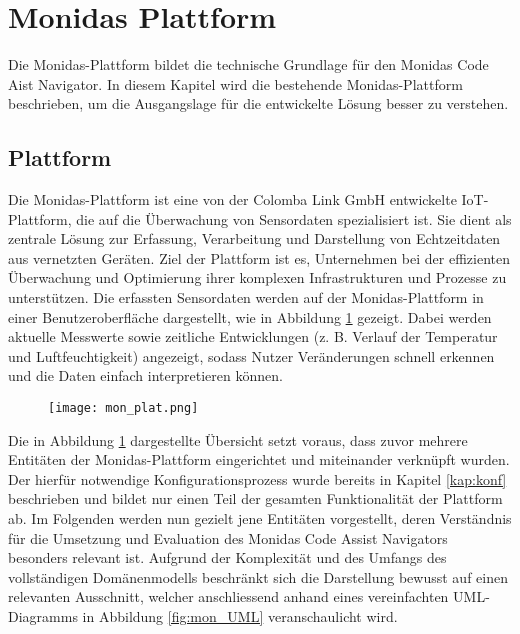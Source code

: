 \section{Monidas Plattform}
\label{mon}
Die Monidas-Plattform bildet die technische Grundlage für den Monidas Code Aist Navigator. In diesem Kapitel wird die bestehende Monidas-Plattform beschrieben, um die Ausgangslage für die entwickelte Lösung besser zu verstehen.

\subsection{Plattform}
Die Monidas-Plattform ist eine von der Colomba Link GmbH entwickelte IoT-Plattform, die auf die Überwachung von Sensordaten spezialisiert ist. Sie dient als zentrale Lösung zur Erfassung, Verarbeitung und Darstellung von Echtzeitdaten aus vernetzten Geräten. Ziel der Plattform ist es, Unternehmen bei der effizienten Überwachung und Optimierung ihrer komplexen Infrastrukturen und Prozesse zu unterstützen. Die erfassten Sensordaten werden auf der Monidas-Plattform in einer Benutzeroberfläche dargestellt, wie in Abbildung \ref{fig:mon_plat} gezeigt. Dabei werden aktuelle Messwerte sowie zeitliche Entwicklungen (z. B. Verlauf der Temperatur und Luftfeuchtigkeit) angezeigt, sodass Nutzer Veränderungen schnell erkennen und die Daten einfach interpretieren können.

\begin{figure}[H]
  \centering
  \texttt{[image: mon\_plat.png]}
  \caption{}
  \label{fig:mon_plat}
\end{figure}

Die in Abbildung \ref{fig:mon_plat} dargestellte Übersicht setzt voraus, dass zuvor mehrere Entitäten der Monidas-Plattform eingerichtet und miteinander verknüpft wurden. Der hierfür notwendige Konfigurationsprozess wurde bereits in Kapitel \ref{kap:konf} beschrieben und bildet nur einen Teil der gesamten Funktionalität der Plattform ab. Im Folgenden werden nun gezielt jene Entitäten vorgestellt, deren Verständnis für die Umsetzung und Evaluation des Monidas Code Assist Navigators besonders relevant ist. Aufgrund der Komplexität und des Umfangs des vollständigen Domänenmodells beschränkt sich die Darstellung bewusst auf einen relevanten Ausschnitt, welcher anschliessend anhand eines vereinfachten UML-Diagramms in Abbildung \ref{fig:mon_UML} veranschaulicht wird.
\newpage

